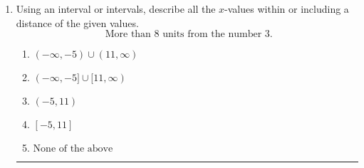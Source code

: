 \documentclass[14pt]{extbook}
\newcommand{\litem}[1]{\item#1\hspace*{-1cm}\rule{\textwidth}{0.4pt}}
\begin{document}
\begin{enumerate}
{\begin{enumerate}[label=\Alph*.]
\end{enumerate} }
\litem{
Using an interval or intervals, describe all the $x$-values within or including a distance of the given values.\[ \text{ More than } 8 \text{ units from the number } 3. \]\begin{enumerate}[label=\Alph*.]
\item \( (-\infty, -5) \cup (11, \infty) \)
\item \( (-\infty, -5] \cup [11, \infty) \)
\item \( (-5, 11) \)
\item \( [-5, 11] \)
\item \( \text{None of the above} \)

\end{enumerate} }
\end{enumerate}
\end{document}
